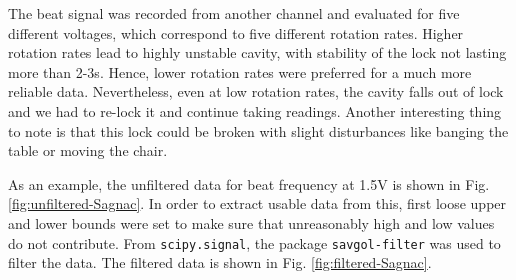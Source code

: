 \documentclass[a4paper]{report}
\numberwithin{equation}{section}
\begin{document}
The beat signal was recorded from another channel and evaluated for five different voltages, which correspond to five different rotation rates. Higher rotation rates lead to highly unstable cavity, with stability of the lock not lasting more than 2-3s. Hence, lower rotation rates were preferred for a much more reliable data. Nevertheless, even at low rotation rates, the cavity falls out of lock and we had to re-lock it and continue taking readings. Another interesting thing to note is that this lock could be broken with slight disturbances like banging the table or moving the chair. 

As an example, the unfiltered data for beat frequency at 1.5V is shown in Fig. \ref{fig:unfiltered-Sagnac}. In order to extract usable data from this, first loose upper and lower bounds were set to make sure that unreasonably high and low values do not contribute. From \texttt{scipy.signal}, the package \texttt{savgol-filter} was used to filter the data. The filtered data is shown in Fig. \ref{fig:filtered-Sagnac}. 


\end{document}
